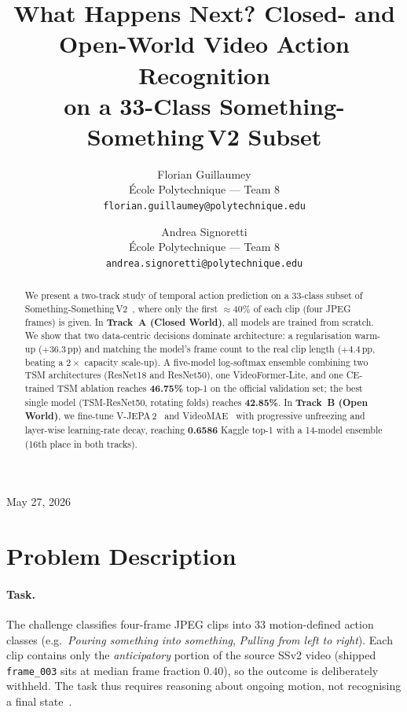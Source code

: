\documentclass[10pt,twocolumn,letterpaper]{article}
\title{What Happens Next? Closed- and Open-World Video Action Recognition\\
on a 33-Class Something-Something\,V2 Subset}
\author{%
Florian Guillaumey\\
\'{E}cole Polytechnique --- Team 8\\
{\tt\small florian.guillaumey@polytechnique.edu}
\and
Andrea Signoretti\\
\'{E}cole Polytechnique --- Team 8\\
{\tt\small andrea.signoretti@polytechnique.edu}
}
\begin{document}
\maketitle
\vspace{-1.2em}
\begin{center}\small May 27, 2026\end{center}

\begin{abstract}
We present a two-track study of temporal action prediction on a 33-class subset of
Something-Something\,V2~\cite{goyal2017ssv2}, where only the first ${\approx}40\%$
of each clip (four JPEG frames) is given.
In \textbf{Track~A (Closed World)}, all models are trained from scratch.
We show that two data-centric decisions dominate architecture:
a regularisation warm-up ($+36.3$\,pp) and matching the model's frame count to the
real clip length ($+4.4$\,pp, beating a $2\times$ capacity scale-up).
A five-model log-softmax ensemble combining two TSM architectures (ResNet18 and
ResNet50), one VideoFormer-Lite, and one CE-trained TSM ablation reaches
\textbf{46.75\%} top-1 on the official validation set; the best single model
(TSM-ResNet50, rotating folds) reaches \textbf{42.85\%}.
In \textbf{Track~B (Open World)}, we fine-tune V-JEPA\,2~\cite{bardes2025vjepa2}
and VideoMAE~\cite{tong2022videomae} with progressive unfreezing and
layer-wise learning-rate decay, reaching \textbf{0.6586} Kaggle top-1 with
a 14-model ensemble (16th place in both tracks).
\end{abstract}

\section{Problem Description}
\label{sec:problem}

\paragraph{Task.}
The challenge classifies four-frame JPEG clips into 33 motion-defined
action classes (e.g.\ \emph{Pouring something into something}, \emph{Pulling
from left to right}). Each clip contains only the \emph{anticipatory} portion of
the source SSv2 video (shipped \texttt{frame\_003} sits at median frame fraction
$0.40$), so the outcome is deliberately withheld.
The task thus requires reasoning about ongoing motion, not recognising a final
state~\cite{goyal2017ssv2}.
\end{document}
